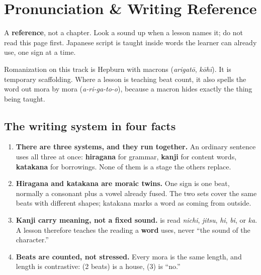 
\chapter*{Pronunciation \& Writing Reference}

A \textbf{reference}, not a chapter. Look a sound up when a lesson names it; do not read this page first. Japanese script is taught inside words the learner can already use, one sign at a time.

Romanization on this track is Hepburn with macrons (\emph{arigatō}, \emph{kōhī}). It is temporary scaffolding. Where a lesson is teaching beat count, it also spells the word out mora by mora (\emph{a-ri-ga-to-o}), because a macron hides exactly the thing being taught.

\section*{The writing system in four facts}

\begin{enumerate}
\raggedright
\setlength{\itemsep}{0.35em}
  \item \textbf{There are three systems, and they run together.} An ordinary sentence uses all three at once: \textbf{hiragana} for grammar, \textbf{kanji} for content words, \textbf{katakana} for borrowings. None of them is a stage the others replace.
  \item \textbf{Hiragana and katakana are moraic twins.} One sign is one beat, normally a consonant plus a vowel already fused. The two sets cover the same beats with different shapes; katakana marks a word as coming from outside.
  \item \textbf{Kanji carry meaning, not a fixed sound.}  is read \emph{nichi}, \emph{jitsu}, \emph{hi}, \emph{bi}, or \emph{ka}. A lesson therefore teaches the reading a \textbf{word} uses, never \textquotedblleft{}the sound of the character.\textquotedblright{}
  \item \textbf{Beats are counted, not stressed.} Every mora is the same length, and length is contrastive: \textbf{} (2 beats) is a house, \textbf{} (3) is \textquotedblleft{}no.\textquotedblright{}
\end{enumerate}

